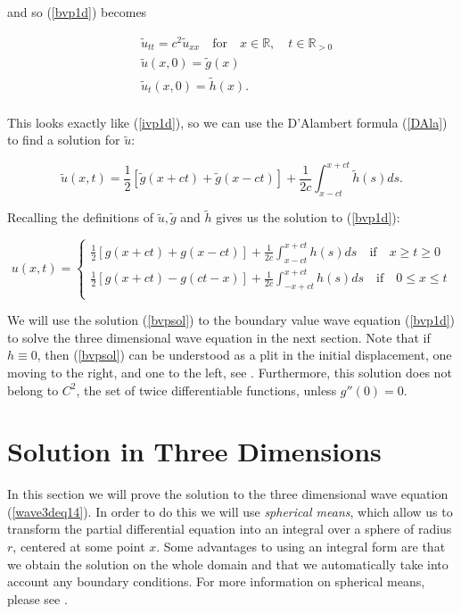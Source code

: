 \documentclass[a4paper, 12pt]{article}
\numberwithin{equation}{section}
\begin{document}
and so (\ref{bvp1d}) becomes 


\begin{align*}
    &\tilde{u}_{tt}=c^2\tilde{u}_{xx} \quad \textrm {for} \quad x \in \mathbb{R}, \quad t \in \mathbb{R}_{>0} \\
    &\tilde{u}(x,0)=\tilde{g}(x)\\
    &\tilde{u}_t(x,0)=\tilde{h}(x).\\
\end{align*}

This looks exactly like (\ref{ivp1d}), so we can use the D'Alambert formula (\ref{DAla}) to find a solution for $\tilde{u}$:

\begin{equation*}
    \tilde{u}(x,t)=\frac{1}{2}\left[\tilde{g}(x+ct)+\tilde{g}(x-ct)\right]+\frac{1}{2c}\int^{x+ct}_{x-ct}\tilde{h}(s)ds.
\end{equation*}

Recalling the definitions of $\tilde{u}, \tilde{g}$ and $\tilde{h}$ gives us the solution to (\ref{bvp1d}):

\begin{equation} \label{bvpsol}
    u(x,t)=
    \begin{cases}
        \frac{1}{2}\left[g(x+ct)+g(x-ct)\right]+\frac{1}{2c}\int^{x+ct}_{x-ct}h(s)ds \quad \textrm{if} \quad x \ge t \ge 0\\
        \frac{1}{2}\left[g(x+ct)-g(ct-x)\right]+\frac{1}{2c}\int^{x+ct}_{-x+ct}h(s)ds \quad \textrm{if} \quad 0 \le x \le t\\
    \end{cases}
\end{equation}

We will use the solution (\ref{bvpsol}) to the boundary value wave equation (\ref{bvp1d}) to solve the three dimensional wave equation in 
the next section. Note that if $h \equiv 0$, then (\ref{bvpsol}) can be understood as a plit in the initial displacement, one moving
to the right, and one to the left, see \cite{Ev}. Furthermore, this solution does not belong to $C^2$, the set of twice differentiable functions, 
unless $g''(0)=0$.

\section{Solution in Three Dimensions}
In this section we will prove the solution to the three dimensional wave equation (\ref{wave3deq14}). In order to do this we will use \emph{spherical
means}, which allow us to transform the partial differential equation into an integral over a sphere of radius $r$, centered at some point $x$. 
Some advantages to using an integral form are that we obtain the solution on the whole domain and that we automatically take into account any
boundary conditions. For more information on spherical means, please see \cite{Sab}. 
\\
\end{document}
